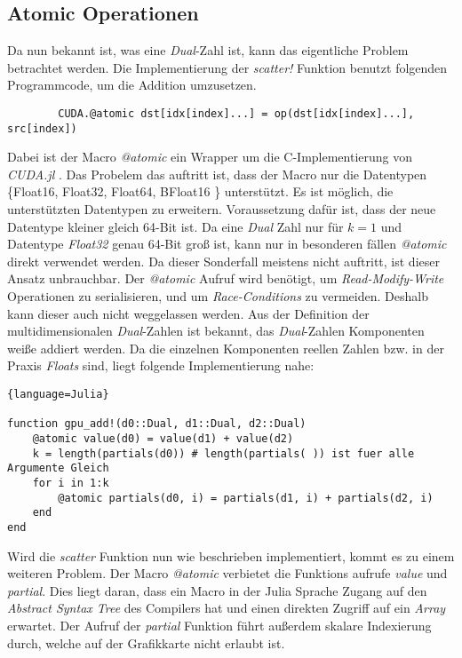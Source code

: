 \subsection{Atomic Operationen} \label{sec:atomic}

Da nun bekannt ist, was eine \textit{Dual}-Zahl ist, 
kann das eigentliche Problem betrachtet werden.
Die Implementierung der \textit{scatter!} Funktion benutzt folgenden Programmcode, um die 
Addition umzusetzen.

\begin{verbatim}
    	CUDA.@atomic dst[idx[index]...] = op(dst[idx[index]...], src[index])
\end{verbatim}


Dabei ist der Macro \textit{@atomic} ein Wrapper um die C-Implementierung von \textit{CUDA.jl} \cite{besard2018juliagpu}.
Das Probelem das auftritt ist, dass der Macro nur die Datentypen \{Float16, Float32, Float64, BFloat16 \}
unterstützt.
Es ist möglich, die unterstützten Datentypen zu erweitern.
Voraussetzung dafür ist, dass der neue Datentype kleiner gleich 64-Bit ist.
Da eine \textit{Dual} Zahl nur für $k = 1$ und Datentype \textit{Float32} genau 64-Bit groß ist,
kann nur in besonderen fällen \textit{@atomic} direkt verwendet werden.
Da dieser Sonderfall meistens nicht auftritt, ist dieser Ansatz unbrauchbar.
Der \textit{@atomic} Aufruf wird benötigt,
um \textit{Read-Modify-Write} Operationen zu serialisieren, 
und um \textit{Race-Conditions} zu vermeiden. 
Deshalb kann dieser auch nicht weggelassen werden.
Aus der Definition der multidimensionalen \textit{Dual}-Zahlen 
ist bekannt, das \textit{Dual}-Zahlen Komponenten weiße addiert werden.
Da die einzelnen Komponenten reellen Zahlen 
bzw. in der Praxis \textit{Floats} sind, liegt folgende Implementierung nahe:

\begin{lstlisting}{language=Julia}

function gpu_add!(d0::Dual, d1::Dual, d2::Dual)
	@atomic value(d0) = value(d1) + value(d2)
	k = length(partials(d0)) # length(partials( )) ist fuer alle Argumente Gleich
	for i in 1:k
		@atomic partials(d0, i) = partials(d1, i) + partials(d2, i)
	end
end

\end{lstlisting}

Wird die \textit{scatter} Funktion nun wie beschrieben implementiert, kommt es zu einem weiteren Problem.
Der Macro \textit{@atomic} verbietet die Funktions aufrufe \textit{value} und \textit{partial}.
Dies liegt daran, dass ein Macro in der Julia Sprache Zugang auf den \textit{Abstract Syntax Tree} des Compilers hat
und einen direkten Zugriff auf ein \textit{Array} erwartet.
Der Aufruf der \textit{partial} Funktion führt außerdem skalare Indexierung durch, welche auf der Grafikkarte nicht erlaubt ist.
